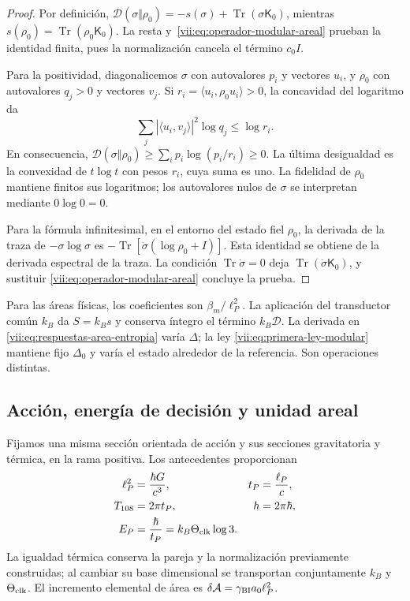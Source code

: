 \begin{proof}
Por definición,
\(\mathcal D(\sigma\Vert\rho_0)=-s(\sigma)
+\operatorname{Tr}(\sigma\mathsf K_0)\), mientras
\(s(\rho_0)=\operatorname{Tr}(\rho_0\mathsf K_0)\).
La resta y~\eqref{vii:eq:operador-modular-areal} prueban la identidad
finita, pues la normalización cancela el término \(c_0I\).

Para la positividad, diagonalicemos \(\sigma\) con autovalores
\(p_i\) y vectores \(u_i\), y \(\rho_0\) con autovalores
\(q_j>0\) y vectores \(v_j\). Si
\(r_i=\langle u_i,\rho_0u_i\rangle>0\), la concavidad del
logaritmo da
\[
 \sum_j|\langle u_i,v_j\rangle|^2\log q_j\le\log r_i.
\]
En consecuencia,
\(\mathcal D(\sigma\Vert\rho_0)
\ge\sum_i p_i\log(p_i/r_i)\ge0\).
La última desigualdad es la convexidad de \(t\log t\) con pesos
\(r_i\), cuya suma es uno. La fidelidad de \(\rho_0\) mantiene
finitos sus logaritmos; los autovalores nulos de \(\sigma\) se
interpretan mediante \(0\log0=0\).

Para la fórmula infinitesimal, en el entorno del estado fiel \(\rho_0\),
la derivada de la traza de \(-\sigma\log\sigma\) es
\(-\operatorname{Tr}[\dot\sigma(\log\rho_0+I)]\).
Esta identidad se obtiene de la derivada espectral de la traza.
La condición \(\operatorname{Tr}\dot\sigma=0\) deja
\(\operatorname{Tr}(\dot\sigma\mathsf K_0)\), y sustituir
\eqref{vii:eq:operador-modular-areal} concluye la prueba.
\end{proof}

Para las áreas físicas, los coeficientes son \(\beta_m/\ell_P^2\).
La aplicación del transductor común \(k_B\) da \(S=k_Bs\) y
conserva íntegro el término \(k_B\mathcal D\). La derivada en
\eqref{vii:eq:respuestas-area-entropia} varía \(\Delta\); la ley
\eqref{vii:eq:primera-ley-modular} mantiene fijo \(\Delta_0\) y
varía el estado alrededor de la referencia. Son operaciones distintas.

\subsection{Acción, energía de decisión y unidad areal}
\label{vii:subsec:conversion-informacion-area}

Fijamos una misma sección orientada de acción y sus secciones gravitatoria
y térmica, en la rama positiva. Los antecedentes proporcionan
\begin{equation}
 \begin{aligned}
 \ell_P^2&=\frac{\hbar G}{c^3},& t_P&=\frac{\ell_P}{c},\\
 T_{108}&=2\pi t_P,& h&=2\pi\hbar,\\
 E_P&=\frac{\hbar}{t_P}=k_B\Theta_{\rm clk}\log3.&&
 \end{aligned}
 \label{vii:eq:unidad-accion-informacion}
\end{equation}
La igualdad térmica conserva la pareja y la normalización previamente
construidas; al cambiar su base dimensional se transportan conjuntamente
\(k_B\) y \(\Theta_{\rm clk}\). El incremento elemental de área es
\(\delta\mathcal A=\gamma_{\rm BI}a_0\ell_P^2\).

